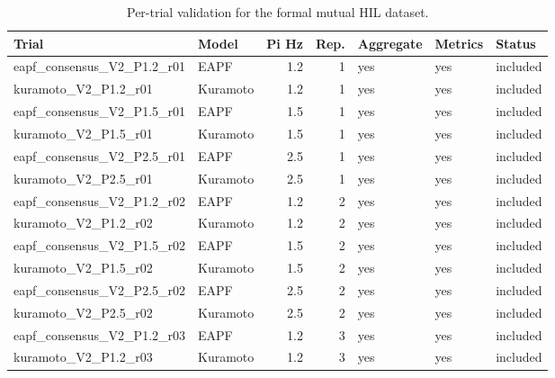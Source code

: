 \begin{table}[htbp]
\centering
\footnotesize
\caption{Per-trial validation for the formal mutual HIL dataset.}
\label{tab:trial_validation}
\begin{tabular}{@{}p{4.55cm}p{2.1cm}rrlll@{}}
\toprule
\textbf{Trial} & \textbf{Model} & \textbf{Pi Hz} & \textbf{Rep.} & \textbf{Aggregate} & \textbf{Metrics} & \textbf{Status} \\
\midrule
eapf\_\allowbreak{}consensus\_\allowbreak{}V2\_\allowbreak{}P1.2\_\allowbreak{}r01 & EAPF & 1.2 & 1 & yes & yes & included \\
kuramoto\_\allowbreak{}V2\_\allowbreak{}P1.2\_\allowbreak{}r01 & Kuramoto & 1.2 & 1 & yes & yes & included \\
eapf\_\allowbreak{}consensus\_\allowbreak{}V2\_\allowbreak{}P1.5\_\allowbreak{}r01 & EAPF & 1.5 & 1 & yes & yes & included \\
kuramoto\_\allowbreak{}V2\_\allowbreak{}P1.5\_\allowbreak{}r01 & Kuramoto & 1.5 & 1 & yes & yes & included \\
eapf\_\allowbreak{}consensus\_\allowbreak{}V2\_\allowbreak{}P2.5\_\allowbreak{}r01 & EAPF & 2.5 & 1 & yes & yes & included \\
kuramoto\_\allowbreak{}V2\_\allowbreak{}P2.5\_\allowbreak{}r01 & Kuramoto & 2.5 & 1 & yes & yes & included \\
eapf\_\allowbreak{}consensus\_\allowbreak{}V2\_\allowbreak{}P1.2\_\allowbreak{}r02 & EAPF & 1.2 & 2 & yes & yes & included \\
kuramoto\_\allowbreak{}V2\_\allowbreak{}P1.2\_\allowbreak{}r02 & Kuramoto & 1.2 & 2 & yes & yes & included \\
eapf\_\allowbreak{}consensus\_\allowbreak{}V2\_\allowbreak{}P1.5\_\allowbreak{}r02 & EAPF & 1.5 & 2 & yes & yes & included \\
kuramoto\_\allowbreak{}V2\_\allowbreak{}P1.5\_\allowbreak{}r02 & Kuramoto & 1.5 & 2 & yes & yes & included \\
eapf\_\allowbreak{}consensus\_\allowbreak{}V2\_\allowbreak{}P2.5\_\allowbreak{}r02 & EAPF & 2.5 & 2 & yes & yes & included \\
kuramoto\_\allowbreak{}V2\_\allowbreak{}P2.5\_\allowbreak{}r02 & Kuramoto & 2.5 & 2 & yes & yes & included \\
eapf\_\allowbreak{}consensus\_\allowbreak{}V2\_\allowbreak{}P1.2\_\allowbreak{}r03 & EAPF & 1.2 & 3 & yes & yes & included \\
kuramoto\_\allowbreak{}V2\_\allowbreak{}P1.2\_\allowbreak{}r03 & Kuramoto & 1.2 & 3 & yes & yes & included \\

\end{tabular}
\end{table}
